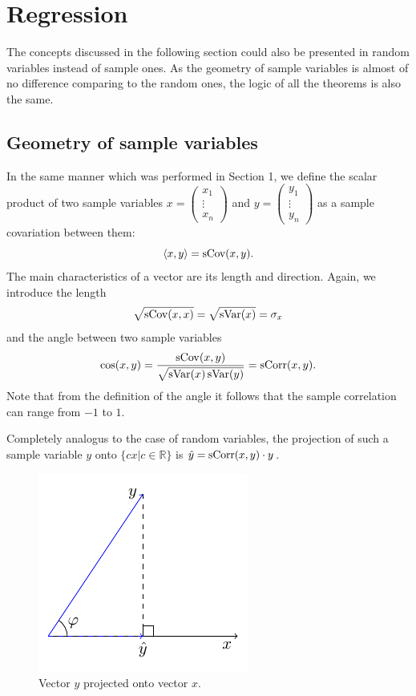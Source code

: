 \section{Regression}

The concepts discussed in the following section could also be presented in
random variables instead of sample ones. As the geometry of sample variables
is almost of no difference comparing to the random ones, the logic of
all the theorems is also the same.

\subsection{Geometry of sample variables}


In the same manner which was performed in Section 1, we define
the scalar product of two sample variables
$x =
\begin{pmatrix}
x_1 \\
\vdots \\
x_n
\end{pmatrix}$
and
$y =
\begin{pmatrix}
y_1 \\
\vdots \\
y_n
\end{pmatrix}$
as a sample covariation between them:
\[
\langle x, y \rangle = \operatorname{sCov}(x, y).
\]
The main characteristics of a vector are its length and direction.
Again, we introduce the length
\[
\sqrt{\operatorname{sCov}(x,x)} = \sqrt{\operatorname{sVar}(x)} = \sigma_x
\]
and the angle between two sample variables
\[
\cos(x,y) = \frac{\operatorname{sCov}(x,y)}{\sqrt{\operatorname{sVar}(x)\operatorname{sVar}(y)}} = \operatorname{sCorr}(x,y).
\]
Note that from the definition of the angle it follows that the sample correlation can range from $-1$ to $1$.

Completely analogus to the case of random variables,
the projection of such a sample variable $y$ onto $\{cx| c \in \mathbb{R}\}$ is $\hat y = \operatorname{sCorr}(x,y) \cdot y$.

\begin{figure}[h!]
\begin{center}
\includegraphics[width=0.4\linewidth]{figures/02_basic_projection.pdf}
\caption{Vector $y$ projected onto vector $x$.}
\label{fig:corr_proj}
\end{center}
\end{figure}

